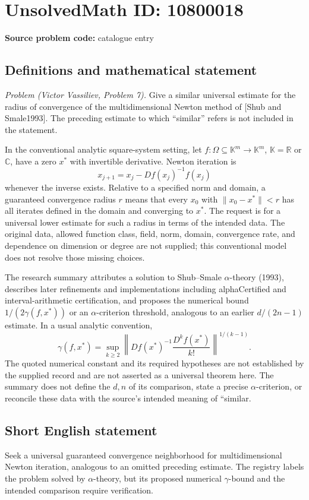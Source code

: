 \documentclass[11pt]{article}
\newcommand{\R}{\mathbb{R}}
\newcommand{\C}{\mathbb{C}}
\begin{document}
\section*{UnsolvedMath ID: 10800018}
\textbf{Source problem code:} catalogue entry
\subsection{Definitions and mathematical statement}
\emph{Problem (Victor Vassiliev, Problem 7).} Give a similar universal estimate for the radius of convergence of the multidimensional Newton method of [Shub and Smale1993]. The preceding estimate to which ``similar'' refers is not included in the statement.

In the conventional analytic square-system setting, let \(f:\Omega\subseteq\mathbb K^m\to\mathbb K^m\), \(\mathbb K=\R\) or \(\C\), have a zero \(x^*\) with invertible derivative. Newton iteration is
\[
 x_{j+1}=x_j-Df(x_j)^{-1}f(x_j)
\]
whenever the inverse exists. Relative to a specified norm and domain, a guaranteed convergence radius \(r\) means that every \(x_0\) with \(\|x_0-x^*\|<r\) has all iterates defined in the domain and converging to \(x^*\). The request is for a universal lower estimate for such a radius in terms of the intended data. The original data, allowed function class, field, norm, domain, convergence rate, and dependence on dimension or degree are not supplied; this conventional model does not resolve those missing choices.

The research summary attributes a solution to Shub--Smale \(\alpha\)-theory (1993), describes later refinements and implementations including alphaCertified and interval-arithmetic certification, and proposes the numerical bound \(1/(2\gamma(f,x^*))\) or an \(\alpha\)-criterion threshold, analogous to an earlier \(d/(2n-1)\) estimate. In a usual analytic convention,
\[
 \gamma(f,x^*)=\sup_{k\geq2}
 \left\|Df(x^*)^{-1}\frac{D^k f(x^*)}{k!}\right\|^{1/(k-1)}.
\]
The quoted numerical constant and its required hypotheses are not established by the supplied record and are not asserted as a universal theorem here. The summary does not define the \(d,n\) of its comparison, state a precise \(\alpha\)-criterion, or reconcile these data with the source's intended meaning of ``similar.
\subsection{Short English statement}
Seek a universal guaranteed convergence neighborhood for multidimensional Newton iteration, analogous to an omitted preceding estimate. The registry labels the problem solved by \(\alpha\)-theory, but its proposed numerical \(\gamma\)-bound and the intended comparison require verification.
\end{document}
